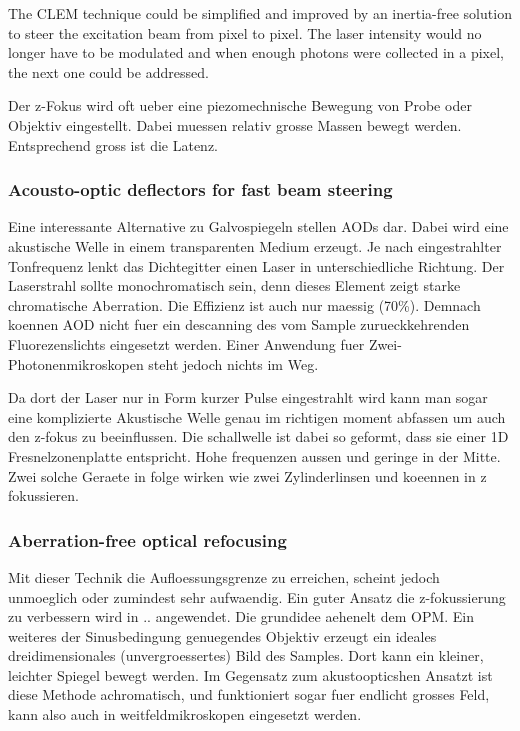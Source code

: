 The CLEM technique could be simplified and improved by an inertia-free
solution to steer the excitation beam from pixel to pixel. The laser
intensity would no longer have to be modulated and when enough photons
were collected in a pixel, the next one could be addressed. 



Der z-Fokus wird oft ueber eine piezomechnische Bewegung von Probe
oder Objektiv eingestellt. Dabei muessen relativ grosse Massen bewegt
werden. Entsprechend gross ist die Latenz.

\subsubsection{Acousto-optic deflectors for fast beam steering}

Eine interessante Alternative zu Galvospiegeln stellen AODs dar. Dabei
wird eine akustische Welle in einem transparenten Medium erzeugt. Je
nach eingestrahlter Tonfrequenz lenkt das Dichtegitter einen Laser in
unterschiedliche Richtung. Der Laserstrahl sollte monochromatisch
sein, denn dieses Element zeigt starke chromatische Aberration. Die
Effizienz ist auch nur maessig (70\%). Demnach koennen AOD nicht fuer
ein descanning des vom Sample zurueckkehrenden Fluorezenslichts
eingesetzt werden. Einer Anwendung fuer Zwei-Photonenmikroskopen steht
jedoch nichts im Weg.

Da dort der Laser nur in Form kurzer Pulse eingestrahlt wird kann man
sogar eine komplizierte Akustische Welle genau im richtigen moment
abfassen um auch den z-fokus zu beeinflussen. Die schallwelle ist
dabei so geformt, dass sie einer 1D Fresnelzonenplatte
entspricht. Hohe frequenzen aussen und geringe in der Mitte. Zwei
solche Geraete in folge wirken wie zwei Zylinderlinsen und koeennen in
z fokussieren.

\subsubsection{Aberration-free optical refocusing}
Mit dieser Technik die Aufloessungsgrenze zu erreichen, scheint jedoch
unmoeglich oder zumindest sehr aufwaendig. Ein guter Ansatz die
z-fokussierung zu verbessern wird in .. angewendet. Die grundidee
aehenelt dem OPM. Ein weiteres der Sinusbedingung genuegendes Objektiv
erzeugt ein ideales dreidimensionales (unvergroessertes) Bild des
Samples. Dort kann ein kleiner, leichter Spiegel bewegt werden. Im
Gegensatz zum akustoopticshen Ansatzt ist diese Methode achromatisch,
und funktioniert sogar fuer endlicht grosses Feld, kann also auch in
weitfeldmikroskopen eingesetzt werden.

